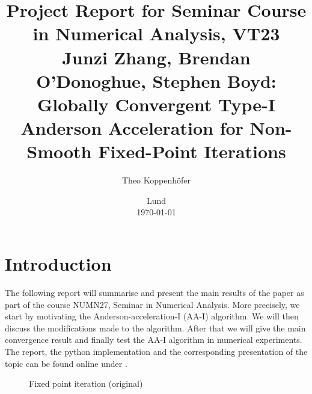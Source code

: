 




\title{ Project Report for Seminar Course in Numerical Analysis, VT23 \\[1ex]
	  \large Junzi Zhang, Brendan O'Donoghue, Stephen Boyd: Globally Convergent Type-I Anderson Acceleration for Non-Smooth Fixed-Point Iterations}
\author{Theo Koppenhöfer}
\date{Lund \\[1ex] \today}







\maketitle

\section{Introduction}

The following report will summarise and present the main results of the paper \cite{ZhaAA} as part of the course NUMN27, Seminar in Numerical Analysis.
More precisely, we start by motivating the Anderson-acceleration-I (AA-I) algorithm. We will then discuss the modifications made to the algorithm. After that we will give the main convergence result and finally test the AA-I algorithm in numerical experiments. The report, the python implementation and the corresponding presentation of the topic can be found online under \cite{Repository}.


\begin{figure}
\centering
\begin{algorithm}[H]
\caption{Fixed point iteration (original)}
\label{alg:original}

\BlankLine
{}
\end{algorithm}
\end{figure}

